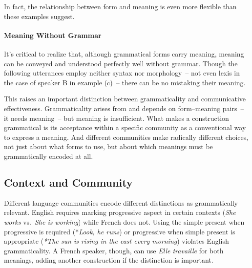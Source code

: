 In fact, the relationship between form and meaning is even more flexible than these examples suggest.

\paragraph*{Meaning Without Grammar}

It's critical to realize that, although grammatical forms carry meaning, meaning can be conveyed and understood perfectly well without grammar. Though the following utterances employ neither syntax nor morphology~-- not even lexis in the case of speaker B in example (c)~-- there can be no mistaking their meaning.

\ea
{}
\z\z

This raises an important distinction between grammaticality and communicative effectiveness. Grammaticality arises from and depends on form--meaning pairs~-- it needs meaning~-- but meaning is insufficient. What makes a construction grammatical is its acceptance within a specific community as a conventional way to express a meaning. And different communities make radically different choices, not just about what forms to use, but about which meanings must be grammatically encoded at all.

\subsection{Context and Community}

Different language communities encode different distinctions as grammatically relevant. English requires marking progressive aspect in certain contexts (\textit{She works} vs.\ \textit{She is working}) while French does not. Using the simple present when progressive is required (*\textit{Look, he runs}) or progressive when simple present is appropriate (\textit{*The sun is rising in the east every morning}) violates English grammaticality. A French speaker, though, can use \textit{Elle travaille} for both meanings, adding another construction if the distinction is important.


